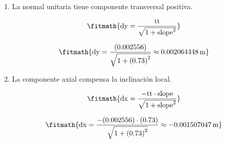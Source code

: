 \begin{enumerate}

\item La normal unitaria tiene componente transversal positiva.

\[\fitmath{\mathrm{dy}=\frac{\mathrm{tt}}{\sqrt{1+{\mathrm{slope}}^{2}}}}\]

\[\fitmath{\mathrm{dy}=\frac{(0.002556)}{\sqrt{1+{(0.73)}^{2}}}\approx 0.002064448\,\mathrm{m}}\]

\item La componente axial compensa la inclinación local.

\[\fitmath{\mathrm{dx}=\frac{-\mathrm{tt}\cdot \mathrm{slope}}{\sqrt{1+{\mathrm{slope}}^{2}}}}\]

\[\fitmath{\mathrm{dx}=\frac{-(0.002556)\cdot (0.73)}{\sqrt{1+{(0.73)}^{2}}}\approx -0.001507047\,\mathrm{m}}\]

\end{enumerate}
